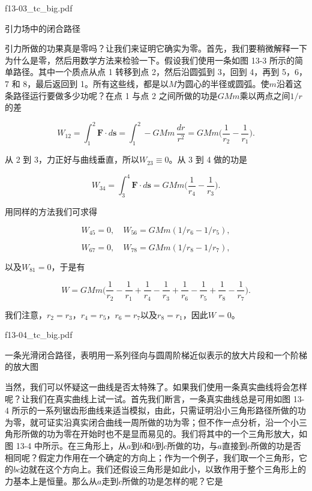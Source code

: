\documentclass[12pt,oneside]{book}
\providecommand{\FLPvec}[1]{\boldsymbol{#1}}
\providecommand{\FLPF}[0]{\FLPvec{F}}
\providecommand{\FLPs}[0]{\FLPvec{s}}
\begin{document}
\begin{fig}{f13-03_tc_big.pdf}
\caption{引力场中的闭合路径}
\label{fig:13-3}
\end{fig}

引力所做的功果真是零吗？让我们来证明它确实为零。首先，我们要稍微解释一下为什么是零，然后用数学方法来检验一下。假设我们使用一条如图 13-3 所示的简单路径。其中一个质点从点 1 转移到点 2，然后沿圆弧到 3，回到 4，再到 5，6，7 和 8，最后返回到 1。所有这些线，都是以$M$为圆心的半径或圆弧。使$m$沿着这条路径运行要做多少功呢？在点 1 与点 2 之间所做的功是$GMm$乘以两点之间$1/r$的差


\begin{equation*}
W_{12}=\int_1^2\FLPF\cdot d\FLPs=\int_1^2-GMm\,\frac{dr}{r^2}=
GMm\biggr(\frac{1}{r_2}-\frac{1}{r_1}\biggr).
\end{equation*}


从 2 到 3，力正好与曲线垂直，所以$W_{23}≡0$。从 3 到 4 做的功是


\begin{equation*}
W_{34}=\int_3^4\FLPF\cdot d\FLPs=
GMm\biggr(\frac{1}{r_4}-\frac{1}{r_3}\biggr).
\end{equation*}

用同样的方法我们可求得

\begin{equation*}
W_{45}=0, \quad W_{56} =GMm(1/r_6 - 1/r_5),
\end{equation*}

\begin{equation*}
W_{67}=0, \quad W_{78} =GMm(1/r_8 - 1/r_7),
\end{equation*}


以及$W_{81}=0$，于是有


\begin{equation*}
W=GMm\biggl(
\frac{1}{r_2}-\frac{1}{r_1}+
\frac{1}{r_4}-\frac{1}{r_3}+
\frac{1}{r_6}-\frac{1}{r_5}+
\frac{1}{r_8}-\frac{1}{r_7}
\biggr).
\end{equation*}

我们注意，$r_2=r_3$，$r_4=r_5$，$r_6=r_7$以及$r_8=r_1$，因此$W=0$。

\begin{fig}{f13-04_tc_big.pdf}
\caption{一条光滑闭合路径，表明用一系列径向与圆周阶梯近似表示的放大片段和一个阶梯的放大图}
\label{fig:13-4}
\end{fig}


当然，我们可以怀疑这一曲线是否太特殊了。如果我们使用一条真实曲线将会怎样呢？让我们在真实曲线上试一试。首先我们断言，一条真实曲线总是可用如图 13-4 所示的一系列锯齿形曲线来适当模拟，由此，只需证明沿小三角形路径所做的功为零，就可证实沿真实闭合曲线一周所做的功为零；但不作一点分析，沿一个小三角形所做的功为零在开始时也不是显而易见的。我们将其中的一个三角形放大，如图 13-4 中所示。在三角形上，从$a$到$b$和$b$到$c$所做的功，与$a$直接到$c$所做的功是否相同呢？假定力作用在一个确定的方向上；作为一个例子，我们取一个三角形，它的$bc$边就在这个方向上。我们还假设三角形是如此小，以致作用于整个三角形上的力基本上是恒量。那么从$a$走到$c$所做的功是怎样的呢？它是
\end{document}
